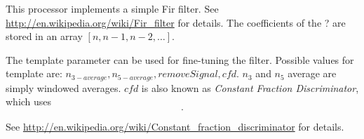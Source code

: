 This processor implements a simple Fir filter. See \url{http://en.wikipedia.org/wiki/Fir\_filter}
for details. The coefficients of the ? are stored in an array $[n, n-1, n-2,\ldots]$.

The {\ttfamily template} parameter can be used for fine-tuning the filter. Possible values 
for {\ttfamily template} are: $n_{3-average}, n_{5-average}, removeSignal, cfd$. $n_3$ and $n_5$
average are simply windowed averages. $cfd$ is also known as {\em Constant Fraction Discriminator}, 
which uses
\begin{displaymath}
   [-0.75,0,0,0,0,0,0,0,0,1].
\end{displaymath}   

See \url{http://en.wikipedia.org/wiki/Constant_fraction_discriminator} for details.